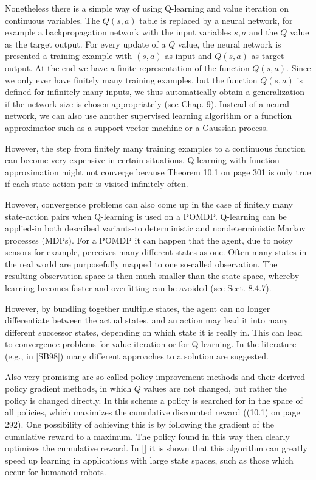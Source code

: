 \documentclass[10pt]{article}
\begin{document}
Nonetheless there is a simple way of using Q-learning and value iteration on continuous variables. The $Q(s, a)$ table is replaced by a neural network, for example a backpropagation network with the input variables $s, a$ and the $Q$ value as the target output. For every update of a $Q$ value, the neural network is presented a training example with $(s, a)$ as input and $Q(s, a)$ as target output. At the end we have a finite representation of the function $Q(s, a)$. Since we only ever have finitely many training examples, but the function $Q(s, a)$ is defined for infinitely many inputs, we thus automatically obtain a generalization if the network size is chosen appropriately (see Chap. 9). Instead of a neural network, we can also use another supervised learning algorithm or a function approximator such as a support vector machine or a Gaussian process.

However, the step from finitely many training examples to a continuous function can become very expensive in certain situations. Q-learning with function approximation might not converge because Theorem 10.1 on page 301 is only true if each state-action pair is visited infinitely often.

However, convergence problems can also come up in the case of finitely many state-action pairs when Q-learning is used on a POMDP. Q-learning can be applied-in both described variants-to deterministic and nondeterministic Markov processes (MDPs). For a POMDP it can happen that the agent, due to noisy sensors for example, perceives many different states as one. Often many states in the real world are purposefully mapped to one so-called observation. The resulting observation space is then much smaller than the state space, whereby learning becomes faster and overfitting can be avoided (see Sect. 8.4.7).

However, by bundling together multiple states, the agent can no longer differentiate between the actual states, and an action may lead it into many different successor states, depending on which state it is really in. This can lead to convergence problems for value iteration or for Q-learning. In the literature (e.g., in [SB98]) many different approaches to a solution are suggested.

Also very promising are so-called policy improvement methods and their derived policy gradient methods, in which $Q$ values are not changed, but rather the policy is changed directly. In this scheme a policy is searched for in the space of all policies, which maximizes the cumulative discounted reward ((10.1) on page 292). One possibility of achieving this is by following the gradient of the cumulative reward to a maximum. The policy found in this way then clearly optimizes the cumulative reward. In [\cite{peters2008reinforcement}] it is shown that this algorithm can greatly speed up learning in applications with large state spaces, such as those which occur for humanoid robots.
\end{document}
